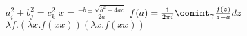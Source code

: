 $a_i^2 + b^2_j = c_k^2$
$x=\frac{-b \pm \sqrt{b^2 - 4ac}}{2a}$
$f(a) = \frac{1}{2 \pi i} \conint_{\gamma}\frac{f(z)}{z-a}dz$
$\lambda f . (\lambda x . f (x x))(\lambda x . f (x x))$
